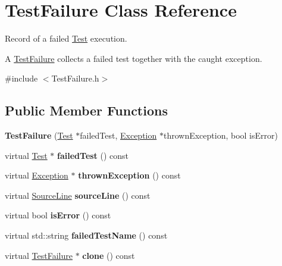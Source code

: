 \hypertarget{class_test_failure}{\section{Test\-Failure Class Reference}
\label{class_test_failure}
}


Record of a failed \hyperlink{class_test}{Test} execution.

A \hyperlink{class_test_failure}{Test\-Failure} collects a failed test together with the caught exception.  




{\ttfamily \#include $<$Test\-Failure.\-h$>$}

\subsection*{Public Member Functions}
\begin{DoxyCompactItemize}
\item 
\hypertarget{class_test_failure_a0ecf7ad4ab673974d30d10ffb2b01790}{{\bfseries Test\-Failure} (\hyperlink{class_test}{Test} $\ast$failed\-Test, \hyperlink{class_exception}{Exception} $\ast$thrown\-Exception, bool is\-Error)}\label{class_test_failure_a0ecf7ad4ab673974d30d10ffb2b01790}

\item 
\hypertarget{class_test_failure_a35aa1b953feff8635c832a53d3c6946d}{virtual \hyperlink{class_test}{Test} $\ast$ {\bfseries failed\-Test} () const }\label{class_test_failure_a35aa1b953feff8635c832a53d3c6946d}

\item 
\hypertarget{class_test_failure_a8e60e0c1ea068bef6c546d20d8260400}{virtual \hyperlink{class_exception}{Exception} $\ast$ {\bfseries thrown\-Exception} () const }\label{class_test_failure_a8e60e0c1ea068bef6c546d20d8260400}

\item 
\hypertarget{class_test_failure_aa3c6a076dca224d7e440212cfd127305}{virtual \hyperlink{class_source_line}{Source\-Line} {\bfseries source\-Line} () const }\label{class_test_failure_aa3c6a076dca224d7e440212cfd127305}

\item 
\hypertarget{class_test_failure_a23b25cf3452b3ab7dc84c70664f13ff0}{virtual bool {\bfseries is\-Error} () const }\label{class_test_failure_a23b25cf3452b3ab7dc84c70664f13ff0}

\item 
\hypertarget{class_test_failure_aca471a29c01d3c5e4d439aadbb1825bf}{virtual std\-::string {\bfseries failed\-Test\-Name} () const }\label{class_test_failure_aca471a29c01d3c5e4d439aadbb1825bf}

\item 
\hypertarget{class_test_failure_a0f0c86f12431ea8adde3e70e0cb52db7}{virtual \hyperlink{class_test_failure}{Test\-Failure} $\ast$ {\bfseries clone} () const }\label{class_test_failure_a0f0c86f12431ea8adde3e70e0cb52db7}

\end{DoxyCompactItemize}
